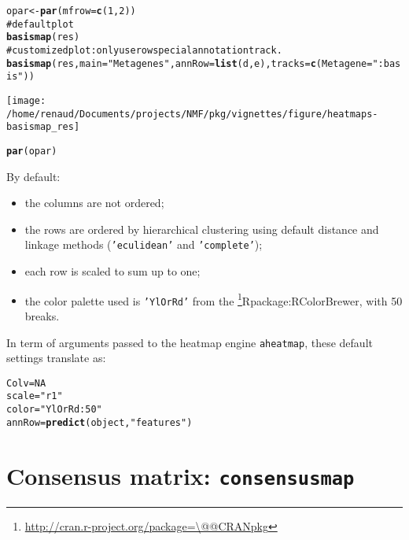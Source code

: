 \documentclass[a4paper]{article}\usepackage{graphicx, color}
\makeatletter
\def\maxwidth{ %
  \ifdim\Gin@nat@width>\linewidth
    \linewidth
  \else
    \Gin@nat@width
  \fi
}
\newcommand{\hlfunctioncall}[1]{\textcolor[rgb]{0.501960784313725,0,0.329411764705882}{\textbf{#1}}}%
\newcommand{\hlstring}[1]{\textcolor[rgb]{0.6,0.6,1}{#1}}%
\newcommand{\hlcomment}[1]{\textcolor[rgb]{0.180392156862745,0.6,0.341176470588235}{#1}}%
\newenvironment{kframe}{%
 \def\at@end@of@kframe{}%
 \ifinner\ifhmode%
  \def\at@end@of@kframe{\end{minipage}}%
  \begin{minipage}{\columnwidth}%
 \fi\fi%
 \def\FrameCommand##1{\hskip\@totalleftmargin \hskip-\fboxsep
 \colorbox{shadecolor}{##1}\hskip-\fboxsep
     \hskip-\linewidth \hskip-\@totalleftmargin \hskip\columnwidth}%
 \MakeFramed {\advance\hsize-\width
   \@totalleftmargin\z@ \linewidth\hsize
   \@setminipage}}%
 {\par\unskip\endMakeFramed%
 \at@end@of@kframe}
\newenvironment{knitrout}{}{} %
\let\code=\texttt
\newcommand{\pkgname}[1]{\textit{#1}\xspace}
\newcommand{\CRANurl}[1]{\url{http://cran.r-project.org/package=#1}}
\def\CRANpkg{\@ifstar\@CRANpkg\@@CRANpkg}
\def\@CRANpkg#1{\href{http://cran.r-project.org/package=#1}{\pkgname{#1}}\footnote{\CRANurl{#1}}}
\def\@@CRANpkg#1{\href{http://cran.r-project.org/package=#1}{\pkgname{#1}} package\footnote{\CRANurl{#1}}}
\def\citeCRANpkg{\@ifstar\@citeCRANpkg\@@citeCRANpkg}
\def\@citeCRANpkg#1{\CRANpkg{#1}\cite*{Rpackage:#1}}
\def\@@citeCRANpkg#1{\CRANpkg{#1}~\cite{Rpackage:#1}}
\renewcommand{\cite}[1]{\parencite{#1}}
\makeatother
\begin{document}
\begin{knitrout}
\color{fgcolor}\begin{kframe}
\begin{alltt}
opar <- \hlfunctioncall{par}(mfrow = \hlfunctioncall{c}(1, 2))
\hlcomment{# default plot}
\hlfunctioncall{basismap}(res)
\hlcomment{# customized plot: only use row special annotation track.}
\hlfunctioncall{basismap}(res, main = \hlstring{"Metagenes"}, annRow = \hlfunctioncall{list}(d, e), tracks = \hlfunctioncall{c}(Metagene = \hlstring{":basis"}))
\end{alltt}
\end{kframe}
\texttt{[image: /home/renaud/Documents/projects/NMF/pkg/vignettes/figure/heatmaps-basismap\_res]} 
\begin{kframe}\begin{alltt}
\hlfunctioncall{par}(opar)
\end{alltt}
\end{kframe}
\end{knitrout}


By default:
\begin{itemize}
\item the columns are not ordered;
\item the rows are ordered by hierarchical clustering using default distance and 
linkage methods (\code{'eculidean'} and \code{'complete'});
\item each row is scaled to sum up to one;
\item the color palette used is \code{'YlOrRd'} from the
\citeCRANpkg{RColorBrewer}, with 50 breaks.
\end{itemize}

In term of arguments passed to the heatmap engine \code{aheatmap}, these default 
settings translate as:

\begin{knitrout}
\color{fgcolor}\begin{kframe}
\begin{alltt}
Colv = NA
scale = \hlstring{"r1"}
color = \hlstring{"YlOrRd:50"}
annRow = \hlfunctioncall{predict}(object, \hlstring{"features"})
\end{alltt}
\end{kframe}
\end{knitrout}


\section{Consensus matrix: \texttt{consensusmap}}
\end{document}
